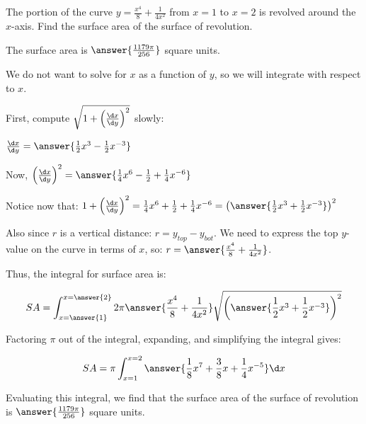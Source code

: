 \documentclass{ximera}
\author{Jim Talamo and Nicholas Hemleben}
\begin{document}
\begin{exercise}

The portion of the curve $y=\frac{x^4}{8} + \frac{1}{4x^2}$ from $x=1$ to $x=2$ is revolved around the $x$-axis.  Find the surface area of the surface of revolution.

The surface area is $\answer{ \frac {1179\pi }{256} }$ square units.

\begin{hint}
We do not want to solve for $x$ as a function of $y$, so we will integrate with respect to $x$.

\begin{question}
First, compute $\sqrt{1+\left(\frac{\d x}{\d y}\right)^2}$ slowly:

$\frac{\d x}{\d y} = \answer{\frac{1}{2}x^3 -\frac{1}{2} x^{-3}}$

\begin{question} 
Now, $\left(\frac{\d x}{\d y}\right)^2 = \answer{\frac{1}{4}x^6 - \frac{1}{2} + \frac{1}{4} x^{-6}}$

\begin{question}
Notice now that: 
$1+ \left(\frac{\d x}{\d y}\right)^2 = \frac{1}{4}x^6 + \frac{1}{2} + \frac{1}{4} x^{-6}=\left( \answer{ \frac {1}{2} x^3 + \frac{1}{2} x^{-3}}\right)^2$

\begin{question}
Also since $r$ is a vertical distance: $r=y_{top}-y_{bot}$.  We need to express the top $y$-value on the curve in terms of $x$, so: $r = \answer{\frac{x^4}{8} + \frac{1}{4x^2}}$.

\begin{question}
Thus, the integral for surface area is:

\[
SA = \int_{x=\answer{1}}^{x=\answer{2}} 2 \pi \answer{\frac{x^4}{8} + \frac{1}{4x^2}}\sqrt{\left(\answer{ \frac {1}{2} x^3 + \frac{1}{2} x^{-3}}\right)^2}
\]

\begin{question}
Factoring $\pi$ out of the integral, expanding, and simplifying the integral gives:

\[
SA= \pi \int_{x=1}^{x=2} \answer{\frac{1}{8} x^7 + \frac{3}{8} x + \frac{1}{4} x^{-5}} \d x 
\]

\end{question}
\end{question}
\end{question}
\end{question}
\end{question} 
\end{question}

Evaluating this integral, we find that the surface area of the surface of revolution is $\answer{ \frac {1179\pi }{256}}$ square units. 
\end{hint}

\begin{exercise}




\end{exercise}
\end{exercise}
\end{document}
